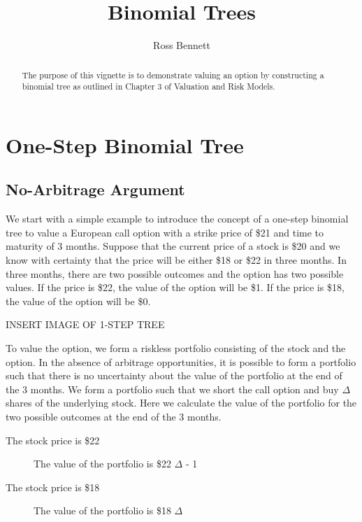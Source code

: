 \documentclass{article}\usepackage[]{graphicx}\usepackage[]{color}
\begin{document}
\title{Binomial Trees}
\author{Ross Bennett}

\maketitle

\begin{abstract}
The purpose of this vignette is to demonstrate valuing an option by constructing a binomial tree as outlined in Chapter 3 of Valuation and Risk Models.
\end{abstract}

\tableofcontents

\section{One-Step Binomial Tree}
\subsection{No-Arbitrage Argument}
We start with a simple example to introduce the concept of a one-step binomial tree to value a European call option with a strike price of \$21 and time to maturity of 3 months. Suppose that the current price of a stock is \$20 and we know with certainty that the price will be either \$18 or \$22 in three months. In three months, there are two possible outcomes and the option has two possible values. If the price is \$22, the value of the option will be \$1. If the price is \$18, the value of the option will be \$0.

INSERT IMAGE OF 1-STEP TREE

To value the option, we form a riskless portfolio consisting of the stock and the option. In the absence of arbitrage opportunities, it is possible to form a portfolio such that there is no uncertainty about the value of the portfolio at the end of the 3 months. We form a portfolio such that we short the call option and buy $\Delta$ shares of the underlying stock. Here we calculate the value of the portfolio for the two possible outcomes at the end of the 3 months.

\begin{description}
  \item[The stock price is \$22]
  The value of the portfolio is \$22 $\Delta$ - 1 
  
  \item[The stock price is \$18]
  The value of the portfolio is \$18 $\Delta$
\end{description}
\end{document}
